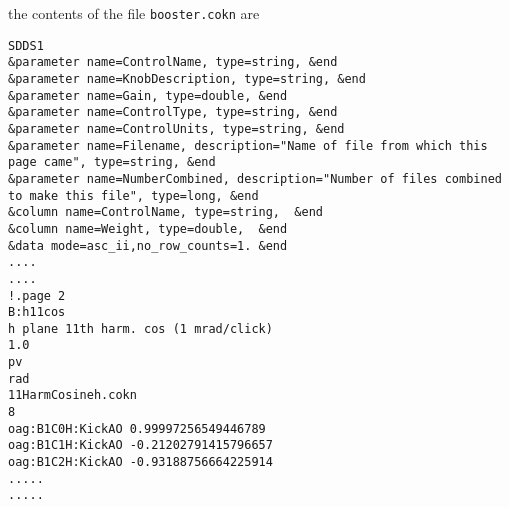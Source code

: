 \begin{itemize}
\begin{verbatim}
\end{verbatim}
the contents of the file \verb+booster.cokn+ are
\begin{verbatim}
SDDS1
&parameter name=ControlName, type=string, &end
&parameter name=KnobDescription, type=string, &end
&parameter name=Gain, type=double, &end
&parameter name=ControlType, type=string, &end
&parameter name=ControlUnits, type=string, &end
&parameter name=Filename, description="Name of file from which this page came", type=string, &end
&parameter name=NumberCombined, description="Number of files combined to make this file", type=long, &end
&column name=ControlName, type=string,  &end
&column name=Weight, type=double,  &end
&data mode=asc_ii,no_row_counts=1. &end
....
....
!.page 2
B:h11cos
h plane 11th harm. cos (1 mrad/click)
1.0
pv
rad
11HarmCosineh.cokn
8
oag:B1C0H:KickAO 0.99997256549446789
oag:B1C1H:KickAO -0.21202791415796657
oag:B1C2H:KickAO -0.93188756664225914
.....
.....

\end{verbatim}


\end{itemize}
